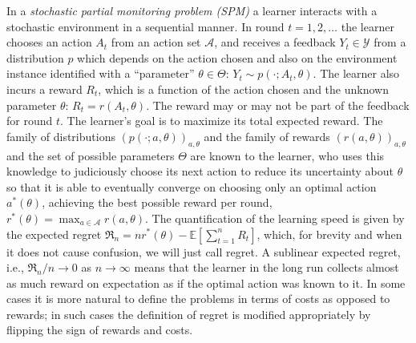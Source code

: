 \documentclass[11pt]{article} %
\newcommand{\todoc}[2][]{\todo[color=Apricot!20,size=\tiny,#1]{Cs: #2}}
\newcommand{\Y}{\mathcal{Y}}
\newcommand{\A}{\mathcal{A}}
\newcommand{\EE}[1]{\mathbb{E}\left[#1\right]}
\newcommand{\Regret}{\mathfrak{R}}
\begin{document}
%
In a \emph{stochastic partial monitoring problem (SPM)} a learner interacts with a stochastic environment in a sequential manner.
In round $t=1,2,\dots$ the learner chooses an action $A_t$ from an action set $\A$, and receives a feedback $Y_t\in \Y$
from a distribution $p$ which depends on the action chosen and also on the environment instance identified
with a ``parameter'' $\theta\in\Theta$:
$Y_t \sim p(\cdot;A_t,\theta)$. 
The learner also incurs a reward $R_t$, which is a function of the action chosen and the unknown parameter $\theta$:
$R_t = r(A_t,\theta)$. 
The reward may or may not be part of the feedback for round $t$.
The learner's goal is to maximize its total expected reward.
The family of distributions $(p(\cdot;a,\theta))_{a,\theta}$ and the family of rewards $(r(a,\theta))_{a,\theta}$
and the set of possible parameters $\Theta$ are known to the learner, who uses this knowledge to judiciously choose
its next action to reduce its uncertainty about $\theta$ so that it is able to eventually converge on choosing only an 
optimal action $a^*(\theta)$, achieving the best possible reward per round, $r^*(\theta) = \max_{a\in \A} r(a,\theta)$.
The quantification of the learning speed is given by the expected regret 
$\Regret_n = n r^*(\theta) - \EE{\sum_{t=1}^n R_t}$, which, for brevity and when it does not cause confusion, 
we will just call regret.
A sublinear expected regret, i.e., $\Regret_n/n \to 0$ as $n\to \infty$ means that the learner in the long run collects
almost as much reward on expectation as if the optimal action was known to it.
In some cases it is more natural to define the problems in terms of costs as opposed to rewards;
in such cases the definition of regret is modified appropriately by flipping the sign of rewards and costs. 
\end{document}
